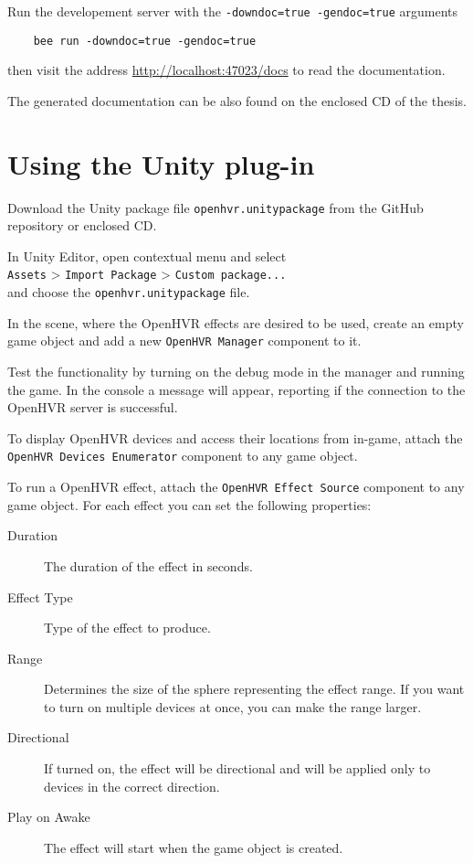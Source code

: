 Run the developement server with the \verb|-downdoc=true -gendoc=true| arguments

\begin{verbatim}
    bee run -downdoc=true -gendoc=true
\end{verbatim}

then visit the address \href{http://localhost:47023/docs}{http://localhost:47023/docs} to read the
documentation.

The generated documentation can be also found on the enclosed CD of the thesis.

\section*{Using the Unity plug-in}

Download the Unity package file \verb|openhvr.unitypackage| from the GitHub
repository or enclosed CD.

In Unity Editor, open contextual menu and select \\
\verb|Assets| > \verb|Import Package| > \verb|Custom package...| \\
and choose the \verb|openhvr.unitypackage| file.

In the scene, where the OpenHVR effects are desired to be used, create an empty
game object and add a new \verb|OpenHVR Manager| component to it.

Test the functionality by turning on the debug mode in the manager and running
the game. In the console a message will appear, reporting if the connection
to the OpenHVR server is successful.

To display OpenHVR devices and access their locations from in-game, attach
the \verb|OpenHVR Devices Enumerator| component to any game object.

To run a OpenHVR effect, attach the \verb|OpenHVR Effect Source| component to
any game object. For each effect you can set the following properties:

\begin{description}
    \item[Duration] The duration of the effect in seconds.
    \item[Effect Type] Type of the effect to produce.
    \item[Range] Determines the size of the sphere representing the effect range.
    If you want to turn on multiple devices at once, you can make the range larger.
    \item[Directional] If turned on, the effect will be directional and will
    be applied only to devices in the correct direction.
    \item[Play on Awake] The effect will start when the game object is created.
\end{description}

